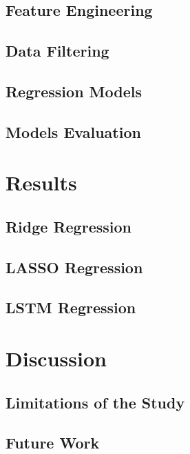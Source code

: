 \documentclass[a4paper, 11pt]{article}
\begin{document}
\subsection{Feature Engineering}

\subsection{Data Filtering}

\subsection{Regression Models}

\subsection{Models Evaluation}

\section{Results}
\subsection{Ridge Regression}

\subsection{LASSO Regression}

\subsection{LSTM Regression}

\section{Discussion}

\subsection{Limitations of the Study}

\subsection{Future Work}



\end{document}
